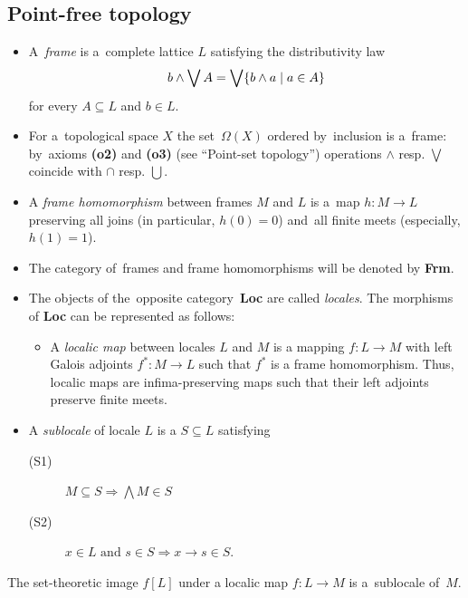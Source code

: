 \subsection*{Point-free topology}

\begin{itemize}
\item A~\emph{frame} is a~complete lattice $L$ satisfying the distributivity
law
\[
  b \wedge \bigvee A = \bigvee \{ b \wedge a \mid a\in A \}
\]
for every $A\subseteq L$ and $b\in L$.

\item For a~topological space $X$ the set~$\Omega(X)$ ordered by~inclusion is
a~frame:
by~axioms {\bf (o2)} and {\bf (o3)} (see ``Point-set topology'') operations
$\wedge$ resp. $\bigvee$ coincide with $\cap$ resp. $\bigcup$.

\item A \emph{frame homomorphism} between frames $M$ and $L$ is a~map $h\colon
M \to L$ preserving all joins (in particular, $h(0) = 0$) and~all finite meets
(especially, $h(1) = 1$).

\item The category of~frames and frame homomorphisms will be denoted by {\bf
Frm}.

\item The objects of the~opposite category~{\bf Loc} are called
\emph{locales\/}.
The morphisms of {\bf Loc} can be represented as follows:

  \begin{itemize}
  \item A \emph{localic map} between locales $L$ and $M$ is a mapping $f\colon L
  \to M$ with left Galois adjoints $f^*\colon M \to L$ such that $f^*$ is a frame
  homomorphism.
  Thus, localic maps are infima-preserving maps such that their left adjoints
  preserve finite meets.
  \end{itemize}

\item A \emph{sublocale} of locale $L$ is a $S\subseteq L$ satisfying
  \begin{description}
  \item[(S1)] $M\subseteq S \Longrightarrow \bigwedge M\in S$
  \item[(S2)] $x\in L \text{ and } s\in S \Longrightarrow x \rightarrow s \in S$.
  \end{description}
\end{itemize}

\begin{fact}
  The set-theoretic image $f[L]$ under a localic map $f\colon L\to M$
  is a~sublocale of~$M$.
\end{fact}


